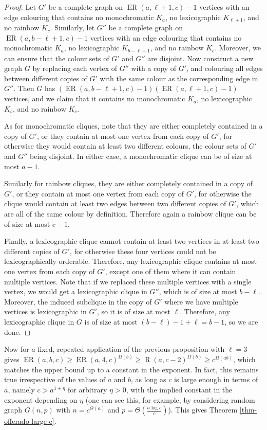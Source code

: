 \documentclass[10pt,a4paper]{article}
\theoremstyle{plain}
\theoremstyle{definition}
\newcommand{\offerado}[3]{\operatorname{ER}(#1,#2,#3)}
\newcommand{\offram}[2]{\operatorname{R}(#1,#2)}
\begin{document}
\begin{proof}
    Let $G'$ be a complete graph on $\offerado{a}{\ell+1}{c}-1$ vertices with an edge colouring that contains no monochromatic $K_a$, no lexicographic $K_{\ell+1}$, and no rainbow $K_c$. Similarly, let $G''$ be a complete graph on $\offerado{a}{b-\ell+1}{c}-1$ vertices with an edge colouring that contains no monochromatic $K_a$, no lexicographic $K_{b-\ell+1}$, and no rainbow $K_c$. Moreover, we can ensure that the colour sets of $G'$ and $G''$ are disjoint. Now construct a new graph $G$ by replacing each vertex of $G''$ with a copy of $G'$, and colouring all edges between different copies of $G'$ with the same colour as the corresponding edge in $G''$. Then $G$ has $(\offerado{a}{b-\ell+1}{c}-1)(\offerado{a}{\ell+1}{c}-1)$ vertices, and we claim that it contains no monochromatic $K_a$, no lexicographic $K_b$, and no rainbow $K_c$.

    As for monochromatic cliques, note that they are either completely contained in a copy of $G'$, or they contain at most one vertex from each copy of $G'$, for otherwise they would contain at least two different colours, the colour sets of $G'$ and $G''$ being disjoint. In either case, a monochromatic clique can be of size at most $a-1$. 

    Similarly for rainbow cliques, they are either completely contained in a copy of $G'$, or they contain at most one vertex from each copy of $G'$, for otherwise the clique would contain at least two edges between two different copies of $G'$, which are all of the same colour by definition. Therefore again a rainbow clique can be of size at most $c-1$.

    Finally, a lexicographic clique cannot contain at least two vertices in at least two different copies of $G'$, for otherwise these four vertices could not be lexicographically orderable. Therefore, any lexicographic clique contains at most one vertex from each copy of $G'$, except one of them where it can contain multiple vertices. Note that if we replaced these multiple vertices with a single vertex, we would get a lexicographic clique in $G''$, which is of size at most $b-\ell$. Moreover, the induced subclique in the copy of $G'$ where we have multiple vertices is lexicographic in $G'$, so it is of size at most $\ell$. Therefore, any lexicographic clique in $G$ is of size at most $(b-\ell)-1+\ell=b-1$, so we are done. 
\end{proof}

Now for $a$ fixed, repeated application of the previous proposition with $\ell=3$ gives $\offerado{a}{b}{c}\ge \offerado{a}{4}{c}^{\Omega(b)} \ge \offram{a}{c-2}^{\Omega(b)} \ge c^{\Omega(ab)}$, which matches the upper bound up to a constant in the exponent. In fact, this remains true irrespective of the values of $a$ and $b$, as long as $c$ is large enough in terms of $a$, namely $c>a^{1+\eta}$ for arbitrary $\eta>0$, with the implied constant in the exponent depending on $\eta$ (one can see this, for example, by considering random graph $G(n,p)$ with $n=c^{\Theta(a)}$ and $p=\Theta(\frac{a\log c}{c})$). This gives Theorem \ref{thm-offerado-large-c}.
\end{document}

